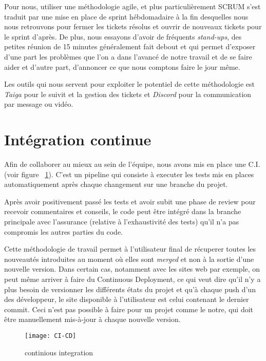 Pour nous, utiliser une méthodologie agile, et plus particulièrement SCRUM s'est
traduit par une mise en place de sprint hébdomadaire à la fin desquelles nous nous
retrouvons pour fermer les tickets résolus et ouvrir de nouveaux tickets pour le
sprint d'après. De plus, nous essayons d'avoir de fréquents \emph{stand-ups}, des
petites réunion de 15 minutes généralement fait debout et qui permet d'exposer
d'une part les problèmes que l'on a dans l'avancé de notre travail et de se faire
aider et d'autre part, d'annoncer ce que nous comptons faire le jour même.

Les outils qui nous servent pour exploiter le potentiel de cette méthodologie est
\emph{Taiga} pour le suivit et la gestion des tickets et \emph{Discord} pour la
communication par message ou vidéo.

\section{Intégration continue}
Afin de collaborer au mieux au sein de l'équipe, nous avons mis en place
une C.I. (voir figure ~\ref{fig:CI-CD}). C'est un pipeline qui consiste à executer
les tests mis en places automatiquement après chaque changement sur une branche
du projet.
\vspace{0.5cm}

Après avoir positivement passé les tests et avoir subit une phase de review
pour recevoir commentaires et conseils, le code peut être intégré dans la
branche principale avec l'assurance (relative à l’exhaustivité des tests) qu'il
n'a pas compromis les autres parties du code.
\vspace{0.5cm}

Cette méthodologie de travail permet à l’utilisateur final de récuperer toutes
les nouveautés introduites au moment où elles sont \emph{merged} et non à la
sortie d’une nouvelle version. Dans certain cas, notamment avec les sites web
par exemple, on peut même arriver à faire du Continuous Deployment, ce qui veut
dire qu’il n’y a plus besoin de versionner les différents états du projet et
qu’à chaque push d’un des développeur, le site disponible à l’utilisateur est
celui contenant le dernier commit. Ceci n'est pas possible à faire pour un
projet comme le notre, qui doit être manuellement mis-à-jour à chaque nouvelle
version.

\begin{figure}[h]
  \texttt{[image: CI-CD]}
  \caption{continious integration}
  \label{fig:CI-CD}
\end{figure}

